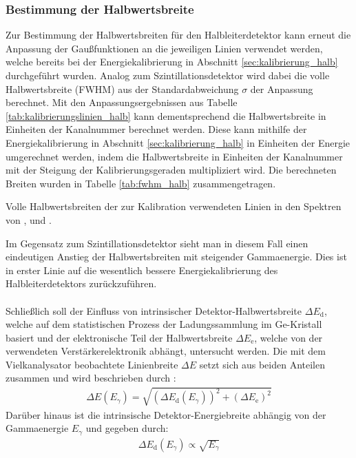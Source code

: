 \documentclass[11pt, a4paper]{article}
\numberwithin{equation}{section}
\begin{document}
\subsubsection{Bestimmung der Halbwertsbreite}
Zur Bestimmung der Halbwertsbreiten für den Halbleiterdetektor kann erneut die Anpassung der Gaußfunktionen an die jeweiligen Linien verwendet werden, welche bereits bei der Energiekalibrierung in Abschnitt \ref{sec:kalibrierung_halb} durchgeführt wurden.
Analog zum Szintillationsdetektor wird dabei die volle Halbwertsbreite (FWHM) aus der Standardabweichung $\sigma$ der Anpassung berechnet.
Mit den Anpassungsergebnissen aus Tabelle \ref{tab:kalibrierungslinien_halb} kann dementsprechend die Halbwertsbreite in Einheiten der Kanalnummer berechnet werden.
Diese kann mithilfe der Energiekalibrierung in Abschnitt \ref{sec:kalibrierung_halb} in Einheiten der Energie umgerechnet werden, indem die Halbwertsbreite in Einheiten der Kanalnummer mit der Steigung der Kalibrierungsgeraden multipliziert wird.
Die berechneten Breiten wurden in Tabelle \ref{tab:fwhm_halb} zusammengetragen.
\begin{table}[ht]
	\centering
	
	\caption{Volle Halbwertsbreiten der zur Kalibration verwendeten Linien in den Spektren von ,  und .}
	\label{tab:fwhm_halb}
\end{table}
Im Gegensatz zum Szintillationsdetektor sieht man in diesem Fall einen eindeutigen Anstieg der Halbwertsbreiten mit steigender Gammaenergie.
Dies ist in erster Linie auf die wesentlich bessere Energiekalibrierung des Halbleiterdetektors zurückzuführen.\\
\\
Schließlich soll der Einfluss von intrinsischer Detektor-Halbwertsbreite $\Delta E_\mathrm{d}$, welche auf dem statistischen Prozess der Ladungssammlung im Ge-Kristall basiert \cite{anleitung} und der elektronische Teil der Halbwertsbreite $\Delta E_\mathrm{e}$, welche von der verwendeten Verstärkerelektronik abhängt, untersucht werden.
Die mit dem Vielkanalysator beobachtete Linienbreite $\Delta E$ setzt sich aus beiden Anteilen zusammen und wird beschrieben durch \cite{anleitung}:
\begin{align}
	\Delta E(E_\gamma) = \sqrt{(\Delta E_\mathrm{d}(E_\gamma))^2 + (\Delta E_\mathrm{e})^2}
\end{align}
Darüber hinaus ist die intrinsische Detektor-Energiebreite abhängig von der Gammaenergie $E_\gamma$ und gegeben durch:
\begin{align}
	\label{eq:prop_energiebreite}
	\Delta E_\mathrm{d}(E_\gamma) \propto \sqrt{E_\gamma}
\end{align}
\end{document}
